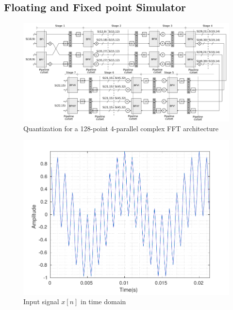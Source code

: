 \documentclass[journal,comsoc]{IEEEtran}
\begin{document}
\subsection{Floating and Fixed point Simulator}
\begin{figure} 
	\centering
	\includegraphics[width=0.95\linewidth]{Diagramas/folding-128-quant-pipe.png}
	\caption{Quantization for a 128-point 4-parallel complex FFT architecture}
	\label{fig:128_folding_quant_pipe}
\end{figure}

\begin{figure} 
	\centering
	\includegraphics[width=0.92\linewidth]{Diagramas/DftInputSignal.pdf}
	\caption{Input signal $x[n]$ in time domain}
	\label{fig:dftinputsignal}
\end{figure}
\end{document}
